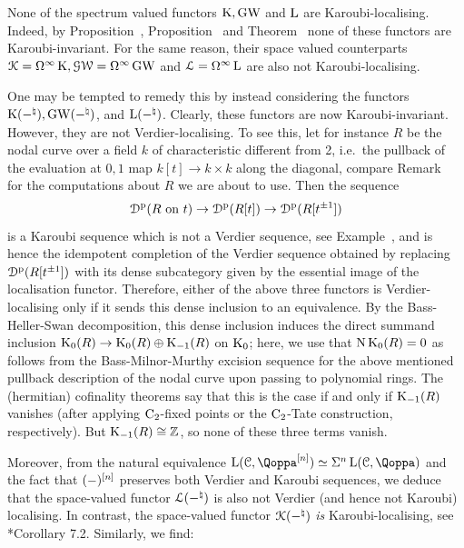 None of the spectrum valued functors $\operatorname K, \operatorname{GW}$ and $\operatorname L$ are Karoubi-localising. Indeed, by Proposition~, Proposition~ and Theorem~ none of these functors are Karoubi-invariant. %
For the same reason, their space valued counterparts $\operatorname{\mathcal{K}} = \Omega^{\infty}\operatorname K, \operatorname{\mathcal{GW}} = \Omega^{\infty}\operatorname{GW}$ and $\operatorname{\mathcal{L}} = \Omega^{\infty}\operatorname L$ are also not Karoubi-localising.

One may be tempted to remedy this by instead considering the functors $\operatorname K(-^\natural), \operatorname{GW}(-^\natural)$, and $\operatorname L(-^\natural)$. Clearly, these functors are now Karoubi-invariant. However, they are not Verdier-localising. To see this, let for instance $R$ be the nodal curve over a field $k$ of characteristic different from 2, i.e.\ the pullback of the evaluation at $0,1$ map $k[t] \to k \times k$ along the diagonal, compare Remark~ for the computations about $R$ we are about to use. Then the sequence 
\[
{\mathcal D}^{\mathrm{p}}(R \textrm{ on } t) \to {\mathcal D}^{\mathrm{p}}(R[t]) \to {\mathcal D}^{\mathrm{p}}(R[t^{\pm1}])
\]
is a Karoubi sequence which is not a Verdier sequence, see Example~, and is hence the idempotent completion of the Verdier sequence obtained by replacing ${\mathcal D}^{\mathrm{p}}(R[t^{\pm1}])$ with its dense subcategory given by the essential image of the localisation functor. 
Therefore, either of the above three functors is Verdier-localising only if it sends this dense inclusion to an equivalence. By the Bass-Heller-Swan decomposition, this dense inclusion induces the direct summand inclusion $\operatorname K_0(R) \to \operatorname K_0(R) \oplus \operatorname K_{-1}(R)$ on $\operatorname K_0$; here, we use that $\mathrm{N}\operatorname K_0(R) = 0$ as follows from the Bass-Milnor-Murthy excision sequence for the above mentioned pullback description of the nodal curve upon passing to polynomial rings. The (hermitian) cofinality theorems say that this is the case if and only if $\operatorname K_{-1}(R)$ vanishes (after applying $\mathrm{C_2}$-fixed points or the $\mathrm{C_2}$-Tate construction, respectively). But $\operatorname K_{-1}(R) \cong \mathbb{Z}$, so none of these three terms vanish.

Moreover, from the natural equivalence $\L(\C,\QF\qshift{n}) \simeq \Sig^n \L(\C,\QF)$ and the fact that $(-)^{[n]}$ preserves both Verdier and Karoubi sequences, we deduce that the space-valued functor $\operatorname{\mathcal{L}}(-^\natural)$ is also not Verdier (and hence not Karoubi) localising. In contrast, the space-valued functor $\operatorname{\mathcal{K}}(-^\natural)$ \emph{is} Karoubi-localising, see \cite{HLS}*{Corollary 7.2}. Similarly, we find:




